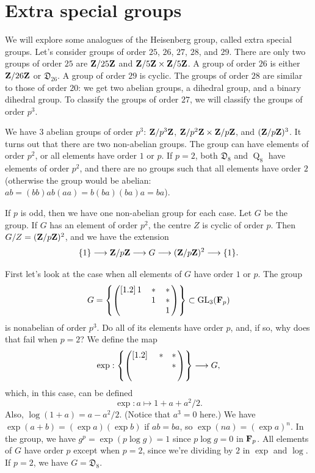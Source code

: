 \documentclass[11pt, twoside]{amsart}
\begin{document}
\section{Extra special groups}
We will explore some analogues of the Heisenberg group, called extra special groups. Let's consider groups of order $25$, $26$, $27$, $28$, and $29$. There are only two groups of order $25$ are $\mathbf{Z}/25\mathbf{Z}$ and $\mathbf{Z}/5\mathbf{Z} \times \mathbf{Z}/5\mathbf{Z} $. A group of order $26$ is either $\mathbf{Z}/{26}\mathbf{Z}$ or $\mathfrak{D}_{26}$. A group of order $29$ is cyclic.  The groups of order $28$ are similar to those of order $20$: we get two abelian groups, a dihedral group, and a binary dihedral group.  To classify the groups of order $27$, we will classify the groups of order $p^3$.

We have $3$ abelian groups of order $p^3$: $\mathbf{Z}/{p^3}\mathbf{Z}$, $\mathbf{Z}/ {p^2}\mathbf{Z}\times \mathbf{Z}/ p\mathbf{Z}$, and $(\mathbf{Z}/{p}\mathbf{Z})^3$. It turns out that there are two non-abelian groups. The group can have elements of order $p^2$, or all elements have order $1$ or $p$. If $p=2$, both $\mathfrak{D}_8$ and $\operatorname{Q}_8 $ have elements of order $p^2$, and there are no groups such that all elements have order $2$ (otherwise the group would be abelian: $ab = (bb)ab(aa) = b (ba)(ba)a = ba$).

If $p$ is odd, then we have one non-abelian group for each case. Let $G$ be the group. If $G$ has an element of order $p^2$, the centre $Z$ is cyclic of order $p$. Then $G/Z = (\mathbf{Z}/p\mathbf{Z})^2$, and we have the extension
$$
\{1\} \longrightarrow \mathbf{Z}/p\mathbf{Z} \longrightarrow G \longrightarrow (\mathbf{Z}/p\mathbf{Z})^2 \longrightarrow \{1\}.
$$

First let's look at the case when all elements of $G$ have order $1$ or $p$. The group
$$
G=\left \{ \begin{pmatrix} [1.2]   \,1 & \,* & \,*\, \\ \, & \,1 &\, *\,\\ \, & \, & \,1\, \end{pmatrix} \right\} \subset \operatorname{GL}_3(\mathbf F_p)
$$ 
is nonabelian of order $p^3$. Do all of its elements have order $p$, and, if so, why does that fail when $p=2$? We define the map
$$
\exp : \left \{ \begin{pmatrix} [1.2]   \,\,& * & *\, \\ \, &  & *\,\\ \, &  & \, \end{pmatrix} \right\} \longrightarrow G,
$$
which, in this case, can be defined
$$
\exp : a \mapsto 1 + a + a^2/2.
$$
Also, $\log(1+a) = a - a^2/2$. (Notice that $a^3 = 0$ here.) We have $\exp (a+b)  = (\exp a)(\exp b)$ if $ab=ba$, so $\exp (na)= (\exp a)^n$. In the group, we have $g^p = \exp (p\log g) = 1$ since $p\log g=0$ in $\mathbf F_p$. All elements of $G$ have order $p$ except when $p=2$, since we're dividing by $2$ in $\exp$ and $\log$. If $p=2$, we have $G = \mathfrak{D}_8$. 
\end{document}
